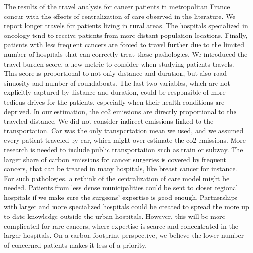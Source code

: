 The results of the travel analysis for cancer patients in metropolitan France
concur with the effects of centralization of care observed in the literature.
We report longer travels for patients living in rural areas. The hospitals
specialized in oncology tend to receive patients from more distant population
locations. Finally, patients with less frequent cancers are forced to travel
further due to the limited number of hospitals that can correctly treat these
pathologies. We introduced the travel burden score, a new metric to consider
when studying patients travels. This score is proportional to not only distance
and duration, but also road sinuosity and number of roundabouts. The last two
variables, which are not explicitly captured by distance and duration, could be
responsible of more tedious drives for the patients, especially when their
health conditions are deprived. In our estimation, the \ac{co2} emissions are
directly proportional to the traveled distance. We did not consider indirect
emissions linked to the transportation. Car was the only transportation mean we
used, and we assumed every patient traveled by car, which might over-estimate
the \ac{co2} emissions. More research is needed to include public transportation
such as train or subway. The larger share of carbon emissions for cancer
surgeries is covered by frequent cancers, that can be treated in many hospitals,
like breast cancer for instance. For such pathologies, a rethink of the
centralization of care model might be needed. Patients from less dense
municipalities could be sent to closer regional hospitals if we make sure the
surgeons' expertise is good enough. Partnerships with larger and more
specialized hospitals could be created to spread the more up to date knowledge
outside the urban hospitals. However, this will be more complicated for rare
cancers, where expertise is scarce and concentrated in the larger hospitals. On
a carbon footprint perspective, we believe the lower number of concerned
patients makes it less of a priority.
